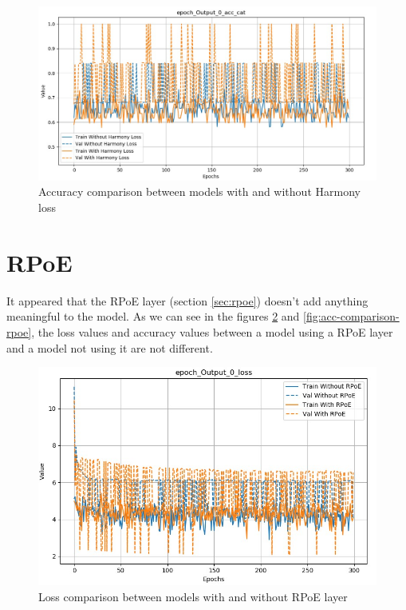 \documentclass[12pt]{report}
\begin{document}
\begin{figure}[ht]
    \centering
    \includegraphics[width=\textwidth]{images/experiences/harmony/acc-comparison-harmony.jpg}
    \caption{Accuracy comparison between models with and without Harmony loss}
    \label{fig:acc-comparison-harmony}
\end{figure}


\section{RPoE}

It appeared that the RPoE layer (section \ref{sec:rpoe}) doesn't add anything meaningful to the model.
As we can see in the figures \ref{fig:loss-comparison-rpoe} and \ref{fig:acc-comparison-rpoe}, the loss values and accuracy values between a model using a RPoE layer and a model not using it are not different.

\begin{figure}[ht]
    \centering
    \includegraphics[width=\textwidth]{images/experiences/rpoe/loss-comparison-rpoe.jpg}
    \caption{Loss comparison between models with and without RPoE layer}
    \label{fig:loss-comparison-rpoe}
\end{figure}
\end{document}
